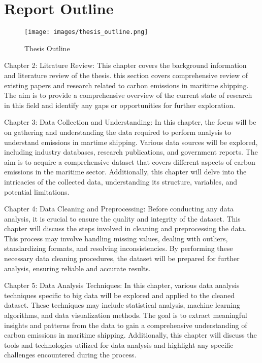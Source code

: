 \section{Report Outline}

\begin{figure}[ht]
    \centering
    \texttt{[image: images/thesis\_outline.png]}
    \caption{Thesis Outline}
    \label{fig:outline}
\end{figure}

\noindent Chapter 2: Litrature Review: This chapter covers the background information and literature review of the thesis.
this section covers comprehensive review of existing papers and research related to carbon emissions in maritime shipping.
The aim is to provide a comprehensive overview of the current state of research in this field and identify any gaps or opportunities for further exploration.


\noindent Chapter 3: Data Collection and Understanding:
In this chapter, the focus will be on gathering and understanding the data required to perform analysis to understand emissions in martime shipping.
Various data sources will be explored, including industry databases, research publications, and government reports.
The aim is to acquire a comprehensive dataset that covers different aspects of carbon emissions in the maritime sector.
Additionally, this chapter will delve into the intricacies of the collected data, understanding its structure, variables, and potential limitations.

\noindent Chapter 4: Data Cleaning and Preprocessing:
Before conducting any data analysis, it is crucial to ensure the quality and integrity of the dataset.
This chapter will discuss the steps involved in cleaning and preprocessing the data.
This process may involve handling missing values, dealing with outliers, standardizing formats, and resolving inconsistencies.
By performing these necessary data cleaning procedures, the dataset will be prepared for further analysis, ensuring reliable and accurate results.

\noindent Chapter 5: Data Analysis Techniques:
In this chapter, various data analysis techniques specific to big data will be explored and applied to the cleaned dataset.
These techniques may include statistical analysis, machine learning algorithms, and data visualization methods.
The goal is to extract meaningful insights and patterns from the data to gain a comprehensive understanding of carbon emissions in maritime shipping.
Additionally, this chapter will discuss the tools and technologies utilized for data analysis and highlight any specific challenges encountered during the process.

